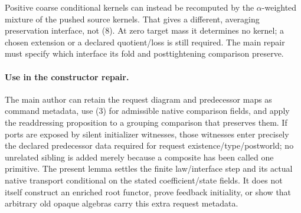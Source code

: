 \documentclass[11pt]{article}
\begin{document}
Positive coarse conditional kernels can instead be recomputed by the $\alpha$-weighted mixture of the pushed source kernels. That gives a different, averaging preservation interface, not (8). At zero target mass it determines no kernel; a chosen extension or a declared quotient/loss is still required. The main repair must specify which interface its fold and posttightening comparison preserve.

\paragraph{Use in the constructor repair.}
The main author can retain the request diagram and predecessor maps as command metadata, use (3) for admissible native comparison fields, and apply the readdressing proposition to a grouping comparison that preserves them. If ports are exposed by silent initializer witnesses, those witnesses enter precisely the declared predecessor data required for request existence/type/postworld; no unrelated sibling is added merely because a composite has been called one primitive. The present lemma settles the finite law/interface step and its actual native transport conditional on the stated coefficient/state fields. It does not itself construct an enriched root functor, prove feedback initiality, or show that arbitrary old opaque algebras carry this extra request metadata.
\end{document}
